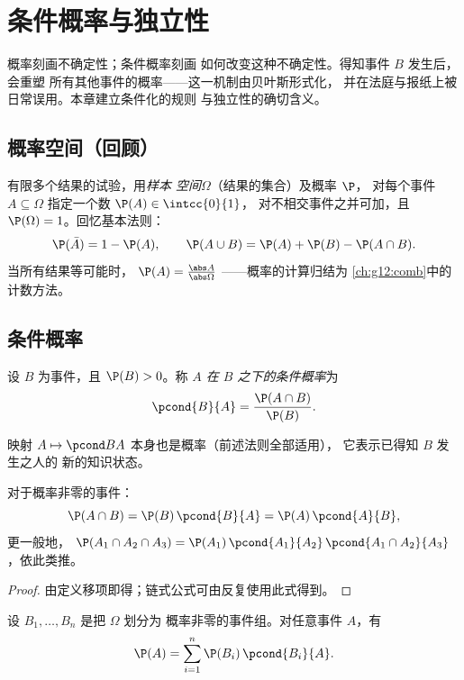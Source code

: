\chapter{条件概率与独立性}\label{ch:g12:condprob}

概率刻画不确定性；条件概率刻画
如何改变这种不确定性。得知事件 $B$ 发生后，会重塑
所有其他事件的概率——这一机制由贝叶斯形式化，
并在法庭与报纸上被日常误用。本章建立条件化的规则
与独立性的确切含义。

\section{概率空间（回顾）}

有限多个结果的试验，用\emph{样本
空间}$\Omega$（结果的集合）及概率 $\P$，
对每个事件 $A \subseteq \Omega$ 指定一个数 $\P(A) \in \intcc{0}{1}$，
对不相交事件之并可加，且 $\P(\Omega) = 1$。回忆基本法则：
\[
\P(\bar A) = 1 - \P(A),
\qquad
\P(A \cup B) = \P(A) + \P(B) - \P(A \cap B).
\]
当所有结果等可能时，
$\P(A) = \frac{\abs A}{\abs\Omega}$ ——概率的计算归结为
\cref{ch:g12:comb}中的计数方法。

\section{条件概率}

\begin{definition}[条件概率]\label{def:g12:condprob:cond}
设 $B$ 为事件，且 $\P(B) > 0$。称 \emph{$A$ 在
$B$ 之下的条件概率}为
\[
\pcond{B}{A} = \frac{\P(A \cap B)}{\P(B)} .
\]
\end{definition}

映射 $A \mapsto \pcond BA$ 本身也是概率（前述法则全部适用），
它表示已得知 $B$ 发生之人的
新的知识状态。

\begin{proposition}[乘法法则]\label{prop:g12:condprob:product}
对于概率非零的事件：
\[
\P(A \cap B) = \P(B)\,\pcond{B}{A} = \P(A)\,\pcond{A}{B},
\]
更一般地，
$\P(A_1 \cap A_2 \cap A_3) = \P(A_1)\,\pcond{A_1}{A_2}\,
\pcond{A_1 \cap A_2}{A_3}$，依此类推。
\end{proposition}

\begin{proof}
由定义移项即得；链式公式可由反复使用此式得到。
\end{proof}

\begin{theorem}[全概率公式]\label{thm:g12:condprob:total}
设 $B_1, \dots, B_n$ 是把 $\Omega$ 划分为
概率非零的事件组。对任意事件 $A$，有
\[
\P(A) = \sum_{i=1}^{n} \P(B_i)\,\pcond{B_i}{A}.
\]
\end{theorem}

